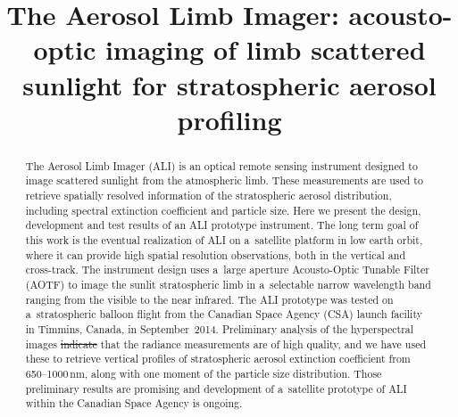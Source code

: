 \documentclass[amtd, online, hvmath]{copernicus}
\providecommand{\DIFadd}[1]{{\protect\color{blue}\uwave{#1}}} %
\providecommand{\DIFdel}[1]{{\protect\color{red}\sout{#1}}}                      %
\providecommand{\DIFaddbegin}{} %
\providecommand{\DIFaddend}{} %
\providecommand{\DIFdelbegin}{} %
\providecommand{\DIFdelend}{} %
\begin{document}
\hack{\sloppy}

\title{The Aerosol Limb Imager: acousto-optic imaging of limb scattered
sunlight for stratospheric aerosol profiling}







\published{}



\maketitle


\begin{abstract}
  The Aerosol Limb Imager (ALI) is an optical remote sensing
  instrument designed to image scattered sunlight from the atmospheric
  limb. These measurements are used to retrieve spatially resolved
  information of the stratospheric aerosol distribution, including
  spectral extinction coefficient and particle size. Here we present
  the design, development and test results of an ALI prototype
  instrument. The long term goal of this work is the eventual
  realization of ALI on a~satellite platform in low earth orbit, where
  it can provide high spatial resolution observations, both in the
  vertical and cross-track. The instrument design uses a~large
  aperture Acousto-Optic Tunable Filter (AOTF) to image the sunlit
  stratospheric limb in a~selectable narrow wavelength band ranging
  from the visible to the near infrared. The ALI prototype was tested
  on a~stratospheric balloon flight from the Canadian Space Agency
  (CSA) launch facility in Timmins, Canada, in
  September~2014. Preliminary analysis of the hyperspectral images
  \DIFdelbegin \DIFdel{indicate }\DIFdelend \DIFaddbegin \DIFadd{indicates }\DIFaddend that the radiance measurements are of high quality, and we
  have used these to retrieve vertical profiles of stratospheric
  aerosol extinction coefficient from 650--1000\,\unit{nm}, along with
  one moment of the particle size distribution. Those preliminary
  results are promising and development of a~satellite prototype of
  ALI within the Canadian Space Agency is ongoing.
\end{abstract}
\end{document}
